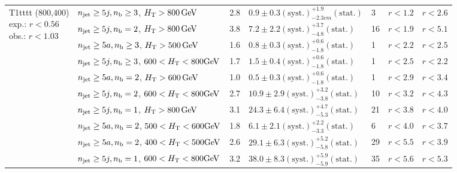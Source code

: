 \begin{table}[h!]
\begin{tabular}{ lllllll }
\multirow{10}{*}{\parbox[t]{2.3cm}{T1tttt (800,400)\\exp.: $r<0.56$\\obs.: $r<1.03$}}
 & $n_{\mathrm{jet}} \geq5j,n_{\text{b}} \geq3$, $\mbox{$H_\text{T}$} > 800 \, \mathrm{GeV}$ & 2.8 & $0.9 \pm 0.3 \mathrm{(syst.)} ^{+1.9}_{-2.3cm} \mathrm{(stat.)}$ & 3 & $r < 1.2$ & $r < 2.6$\\ 
 & $n_{\mathrm{jet}} \geq5j,n_{\text{b}} =2$, $\mbox{$H_\text{T}$} > 800 \, \mathrm{GeV}$ & 3.8 & $7.2 \pm 2.2 \mathrm{(syst.)} ^{+3.7}_{-4.8} \mathrm{(stat.)}$ & 16 & $r < 1.9$ & $r < 5.1$\\ 
 & $n_{\mathrm{jet}} \geq5a,n_{\text{b}} \geq3$, $\mbox{$H_\text{T}$} > 500 \, \mathrm{GeV}$ & 1.6 & $0.8 \pm 0.3 \mathrm{(syst.)} ^{+0.6}_{-1.8} \mathrm{(stat.)}$ & 1 & $r < 2.2$ & $r < 2.5$\\ 
 & $n_{\mathrm{jet}} \geq5j,n_{\text{b}} \geq3$, $600 < \mbox{$H_\text{T}$} < 800 \mathrm{GeV}$ & 1.7 & $1.5 \pm 0.4 \mathrm{(syst.)} ^{+0.6}_{-1.8} \mathrm{(stat.)}$ & 1 & $r < 2.5$ & $r < 2.2$\\ 
 & $n_{\mathrm{jet}} \geq5a,n_{\text{b}} =2$, $\mbox{$H_\text{T}$} > 600 \, \mathrm{GeV}$ & 1.0 & $0.5 \pm 0.3 \mathrm{(syst.)} ^{+0.6}_{-1.8} \mathrm{(stat.)}$ & 1 & $r < 2.9$ & $r < 3.4$\\ 
 & $n_{\mathrm{jet}} \geq5j,n_{\text{b}} =2$, $600 < \mbox{$H_\text{T}$} < 800 \mathrm{GeV}$ & 2.7 & $10.9 \pm 2.9 \mathrm{(syst.)} ^{+3.2}_{-3.8} \mathrm{(stat.)}$ & 10 & $r < 3.2$ & $r < 4.3$\\ 
 & $n_{\mathrm{jet}} \geq5j,n_{\text{b}} =1$, $\mbox{$H_\text{T}$} > 800 \, \mathrm{GeV}$ & 3.1 & $24.3 \pm 6.4 \mathrm{(syst.)} ^{+4.7}_{-5.3} \mathrm{(stat.)}$ & 21 & $r < 3.8$ & $r < 4.0$\\ 
 & $n_{\mathrm{jet}} \geq5a,n_{\text{b}} =2$, $500 < \mbox{$H_\text{T}$} < 600 \mathrm{GeV}$ & 1.8 & $6.1 \pm 2.1 \mathrm{(syst.)} ^{+2.2}_{-3.3} \mathrm{(stat.)}$ & 6 & $r < 4.0$ & $r < 3.7$\\ 
 & $n_{\mathrm{jet}} \geq5a,n_{\text{b}} =2$, $400 < \mbox{$H_\text{T}$} < 500 \mathrm{GeV}$ & 2.6 & $29.1 \pm 6.3 \mathrm{(syst.)} ^{+5.2}_{-5.8} \mathrm{(stat.)}$ & 29 & $r < 5.5$ & $r < 3.9$\\ 
 & $n_{\mathrm{jet}} \geq5j,n_{\text{b}} =1$, $600 < \mbox{$H_\text{T}$} < 800 \mathrm{GeV}$ & 3.2 & $38.0 \pm 8.3 \mathrm{(syst.)} ^{+5.9}_{-5.9} \mathrm{(stat.)}$ & 35 & $r < 5.6$ & $r < 5.3$\\ \hline
    \hline
  \end{tabular}
\end{table}

